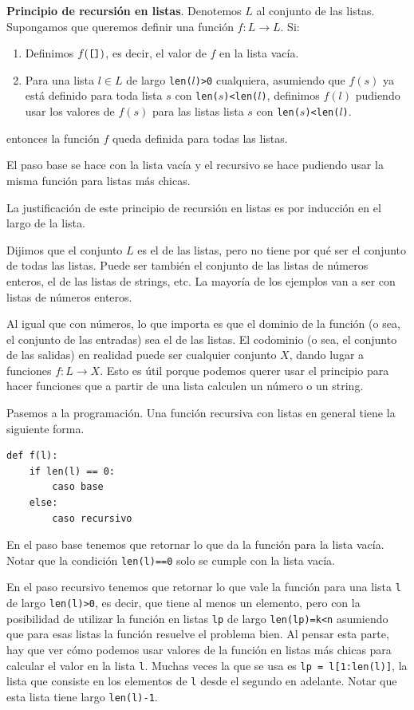 \documentclass[a4paper, 12pt]{report}
\newcommand{\te}{\text}
\theoremstyle{definition}
\begin{document}
{\bf Principio de recursión en listas}. Denotemos $L$ al conjunto de las listas. Supongamos que queremos definir una función $f:L\to L$. Si:
\begin{enumerate}
	\item Definimos $f(\te{\tt []})$, es decir, el valor de $f$ en la lista vacía.
	\item Para una lista $l\in L$ de largo {\tt len($l$)>0} cualquiera, asumiendo que $f(s)$ ya está definido para toda lista $s$ con {\tt len($s$)<len($l$)}, definimos $f(l)$ pudiendo usar los valores de $f(s)$ para las listas lista $s$ con {\tt len($s$)<len($l$)}.
\end{enumerate}
entonces la función $f$ queda definida para todas las listas.

El paso base se hace con la lista vacía y el recursivo se hace pudiendo usar la misma función para listas más chicas.

La justificación de este principio de recursión en listas es por inducción en el largo de la lista.

Dijimos que el conjunto $L$ es el de las listas, pero no tiene por qué ser el conjunto de todas las listas. Puede ser también el conjunto de las listas de números enteros, el de las listas de strings, etc. La mayoría de los ejemplos van a ser con listas de números enteros.

Al igual que con números, lo que importa es que el dominio de la función (o sea, el conjunto de las entradas) sea el de las listas. El codominio (o sea, el conjunto de las salidas) en realidad puede ser cualquier conjunto $X$, dando lugar a funciones $f:L\to X$. Esto es útil porque podemos querer usar el principio para hacer funciones que a partir de una lista calculen un número o un string.

Pasemos a la programación. Una función recursiva con listas en general tiene la siguiente forma.

\begin{verbatim}
def f(l):
    if len(l) == 0:
        caso base
    else:
        caso recursivo
\end{verbatim}

En el paso base tenemos que retornar lo que da la función para la lista vacía. Notar que la condición {\tt len(l)==0} solo se cumple con la lista vacía.

En el paso recursivo tenemos que retornar lo que vale la función para una lista {\tt l} de largo {\tt len(l)>0}, es decir, que tiene al menos un elemento, pero con la posibilidad de utilizar la función en listas {\tt lp} de largo {\tt len(lp)=k<n} asumiendo que para esas listas la función resuelve el problema bien. Al pensar esta parte, hay que ver cómo podemos usar valores de la función en listas más chicas para calcular el valor en la lista {\tt l}. Muchas veces la que se usa es {\tt lp = l[1:len(l)]}, la lista que consiste en los elementos de {\tt l} desde el segundo en adelante. Notar que esta lista tiene largo {\tt len(l)-1}.
\end{document}
